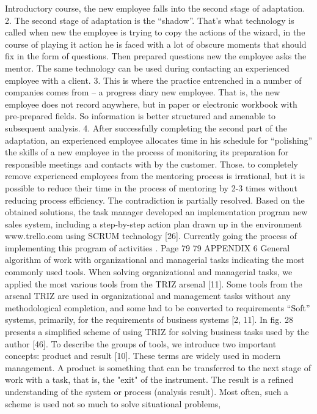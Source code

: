 Introductory course, the new employee falls into the second stage of adaptation.
2. The second stage of adaptation is the “shadow”. That's what technology is called when new
the employee is trying to copy the actions of the wizard, in the course of playing it
action he is faced with a lot of obscure moments that
should fix in the form of questions. Then prepared questions new
the employee asks the mentor. The same technology can be used during
contacting an experienced employee with a client.
3. This is where the practice entrenched in a number of companies comes from -- a progress diary
new employee. That is, the new employee does not record anywhere, but in
paper or electronic workbook with pre-prepared fields. So
information is better structured and amenable to subsequent analysis.
4. After successfully completing the second part of the adaptation, an experienced employee
allocates time in his schedule for “polishing” the skills of a new employee in
the process of monitoring its preparation for responsible meetings and contacts with
by the customer.
Those. to completely remove experienced employees from the mentoring process is irrational,
but it is possible to reduce their time in the process of mentoring by 2-3 times without reducing
process efficiency. The contradiction is partially resolved.
Based on the obtained solutions, the task manager developed an implementation program
new sales system, including a step-by-step action plan drawn up in the environment
www.trello.com using SCRUM technology [26]. Currently going
the process of implementing this program of activities .
Page 79
79
APPENDIX 6
General algorithm of work with organizational and managerial
tasks indicating the most commonly used tools.
When solving organizational and managerial tasks, we applied the most
various tools from the TRIZ arsenal [11]. Some tools from the arsenal
TRIZ are used in organizational and management tasks without any
methodological completion, and some had to be converted to requirements
“Soft” systems, primarily, for the requirements of business systems [2, 11].
In fig. 28 presents a simplified scheme of using TRIZ for solving business
tasks used by the author [46]. To describe the groups of tools, we introduce two important
concepts: product and result [10]. These terms are widely used in modern
management. A product is something that can be transferred to the next stage of work with a task,
that is, the "exit" of the instrument. The result is a refined understanding of the system or
process (analysis result).
Most often, such a scheme is used not so much to solve situational problems,
